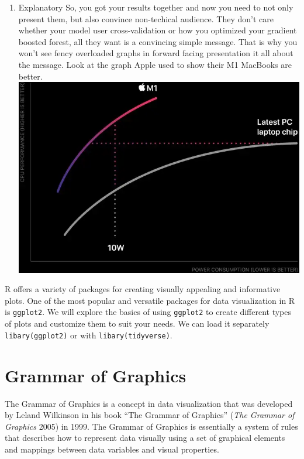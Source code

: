 \documentclass[
  letterpaper,
]{book}
\providecommand{\tightlist}{%
  \setlength{\itemsep}{0pt}\setlength{\parskip}{0pt}}\usepackage{longtable,booktabs,array}
\begin{document}
\begin{enumerate}
\def\labelenumi{\arabic{enumi}.}
\setcounter{enumi}{1}
\tightlist
\item
  Explanatory So, you got your results together and now you need to not
  only present them, but also convince non-techical audience. They don't
  care whether your model user cross-validation or how you optimized
  your gradient boosted forest, all they want is a convincing simple
  message. That is why you won't see fency overloaded graphs in forward
  facing presentation it all about the message. Look at the graph Apple
  used to show their M1 MacBooks are better.
  \includegraphics{./images/apple_graph.png}
\end{enumerate}

R offers a variety of packages for creating visually appealing and
informative plots. One of the most popular and versatile packages for
data visualization in R is \texttt{ggplot2}. We will explore the basics
of using \texttt{ggplot2} to create different types of plots and
customize them to suit your needs. We can load it separately
\texttt{libary(ggplot2)} or with \texttt{libary(tidyverse)}.

\hypertarget{grammar-of-graphics}{%
\section{Grammar of Graphics}\label{grammar-of-graphics}}

The Grammar of Graphics is a concept in data visualization that was
developed by Leland Wilkinson in his book ``The Grammar of Graphics''
(\emph{The Grammar of Graphics}
2005)
in 1999. The Grammar of Graphics is essentially a system of rules that
describes how to represent data visually using a set of graphical
elements and mappings between data variables and visual properties.
\end{document}
